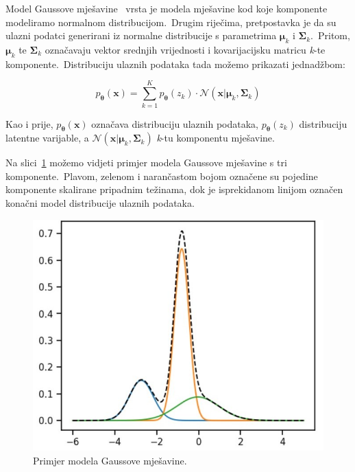 \documentclass[times, utf8, seminar, numeric]{fer}
\begin{document}
Model Gaussove mješavine~\cite{reynolds2009gaussian} vrsta je modela mješavine kod koje komponente modeliramo normalnom distribucijom.\
Drugim riječima, pretpostavka je da su ulazni podatci generirani iz normalne distribucije s parametrima $\bm{\mu}_k$ i $\bm{\Sigma}_k$.\ 
Pritom, $\bm{\mu}_k$ te $\bm{\Sigma}_k$ označavaju vektor srednjih vrijednosti i kovarijacijsku matricu \textit{k}-te komponente.\
Distribuciju ulaznih podataka tada možemo prikazati jednadžbom:

\begin{equation}
    p_{\bm{\theta}}(\bm{x}) = \sum_{k=1}^{K} p_{\bm{\theta}}(z_k) \cdot \mathcal{N}(\bm{x}|\bm{\mu}_k, \bm{\Sigma}_k)
    \label{eq:gaussian_mixture_model}
\end{equation}

Kao i prije, $p_{\bm{\theta}}(\bm{x})$ označava distribuciju ulaznih podataka, $p_{\bm{\theta}}(z_k)$ distribuciju latentne varijable, a $\mathcal{N}(\bm{x}|\bm{\mu}_k, \bm{\Sigma}_k)$ \textit{k}-tu komponentu mješavine.\ 
  
Na slici~\ref{fig:GMM} možemo vidjeti primjer modela Gaussove mješavine s tri komponente.\ Plavom, zelenom i narančastom bojom označene su pojedine komponente skalirane pripadnim težinama, dok je isprekidanom linijom označen konačni model distribucije ulaznih podataka.\

\begin{figure}[h]
    \centering
    \includegraphics[scale=1]{./Slike/GMM.jpg}
    \caption{Primjer modela Gaussove mješavine.}
    \label{fig:GMM}
\end{figure}
\end{document}
